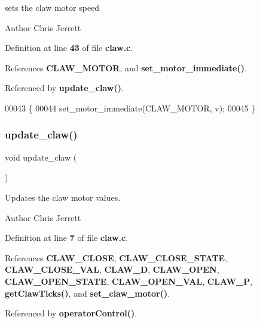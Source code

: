 sets the claw motor speed 

\begin{DoxyAuthor}{Author}
Chris Jerrett 
\end{DoxyAuthor}


Definition at line \textbf{ 43} of file \textbf{ claw.\+c}.



References \textbf{ C\+L\+A\+W\+\_\+\+M\+O\+T\+OR}, and \textbf{ set\+\_\+motor\+\_\+immediate()}.



Referenced by \textbf{ update\+\_\+claw()}.


\begin{DoxyCode}
00043                                 \{
00044   set_motor_immediate(CLAW_MOTOR, v);
00045 \}
\end{DoxyCode}
\mbox{\label{claw_8c_a0122b78972344264b8a276a559cfce4a}} 
\subsubsection{update\+\_\+claw()}
{\footnotesize\ttfamily void update\+\_\+claw (\begin{DoxyParamCaption}{ }\end{DoxyParamCaption})}



Updates the claw motor values. 

\begin{DoxyAuthor}{Author}
Chris Jerrett 
\end{DoxyAuthor}


Definition at line \textbf{ 7} of file \textbf{ claw.\+c}.



References \textbf{ C\+L\+A\+W\+\_\+\+C\+L\+O\+SE}, \textbf{ C\+L\+A\+W\+\_\+\+C\+L\+O\+S\+E\+\_\+\+S\+T\+A\+TE}, \textbf{ C\+L\+A\+W\+\_\+\+C\+L\+O\+S\+E\+\_\+\+V\+AL}, \textbf{ C\+L\+A\+W\+\_\+D}, \textbf{ C\+L\+A\+W\+\_\+\+O\+P\+EN}, \textbf{ C\+L\+A\+W\+\_\+\+O\+P\+E\+N\+\_\+\+S\+T\+A\+TE}, \textbf{ C\+L\+A\+W\+\_\+\+O\+P\+E\+N\+\_\+\+V\+AL}, \textbf{ C\+L\+A\+W\+\_\+P}, \textbf{ get\+Claw\+Ticks()}, and \textbf{ set\+\_\+claw\+\_\+motor()}.



Referenced by \textbf{ operator\+Control()}.


